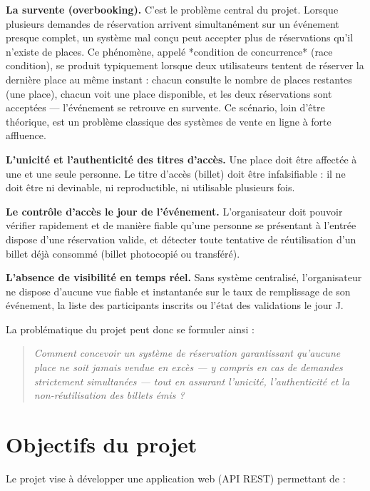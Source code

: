 \documentclass[12pt,a4paper]{report}
\begin{document}
\textbf{La survente (overbooking).} C'est le problème central du projet. Lorsque plusieurs demandes de réservation arrivent simultanément sur un événement presque complet, un système mal conçu peut accepter plus de réservations qu'il n'existe de places. Ce phénomène, appelé *condition de concurrence* (race condition), se produit typiquement lorsque deux utilisateurs tentent de réserver la dernière place au même instant : chacun consulte le nombre de places restantes (une place), chacun voit une place disponible, et les deux réservations sont acceptées — l'événement se retrouve en survente. Ce scénario, loin d'être théorique, est un problème classique des systèmes de vente en ligne à forte affluence.

\textbf{L'unicité et l'authenticité des titres d'accès.} Une place doit être affectée à une et une seule personne. Le titre d'accès (billet) doit être infalsifiable : il ne doit être ni devinable, ni reproductible, ni utilisable plusieurs fois.

\textbf{Le contrôle d'accès le jour de l'événement.} L'organisateur doit pouvoir vérifier rapidement et de manière fiable qu'une personne se présentant à l'entrée dispose d'une réservation valide, et détecter toute tentative de réutilisation d'un billet déjà consommé (billet photocopié ou transféré).

\textbf{L'absence de visibilité en temps réel.} Sans système centralisé, l'organisateur ne dispose d'aucune vue fiable et instantanée sur le taux de remplissage de son événement, la liste des participants inscrits ou l'état des validations le jour J.

La problématique du projet peut donc se formuler ainsi :

\begin{quote}\itshape Comment concevoir un système de réservation garantissant qu'aucune place ne soit jamais vendue en excès — y compris en cas de demandes strictement simultanées — tout en assurant l'unicité, l'authenticité et la non-réutilisation des billets émis ?\end{quote}

\section{Objectifs du projet}

Le projet vise à développer une application web (API REST) permettant de :
\end{document}
